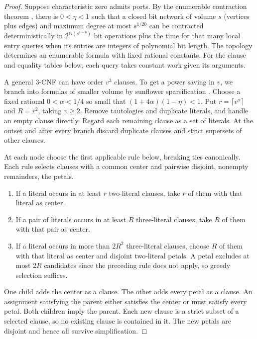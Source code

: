 \begin{proof}
Suppose characteristic zero admits ports. By the enumerable contraction
theorem \cite[Theorem~]{oaP}, there is $0<\eta<1$
such that a closed bit network of volume $s$ (vertices plus edges)
and maximum degree at most $s^{1/20}$ can be contracted
deterministically in $2^{O(s^{1-\eta})}$ bit operations plus the time
for that many local entry queries when its entries are integers of
polynomial bit length. The topology determines an enumerable formula
with fixed rational constants. For the clause and equality tables
below, each query takes constant work given its arguments.

A general 3-CNF can have order $v^3$ clauses. To get a power saving
in $v$, we branch into formulas of smaller volume by sunflower
sparsification \cite{IPZ}. Choose a fixed rational $0<\alpha<1/4$
so small that $(1+4\alpha)(1-\eta)<1$. Put $r=\lceil v^\alpha\rceil$
and $R=r^2$, taking $v\ge2$. Remove tautologies and duplicate literals,
and handle an empty clause directly. Regard each remaining clause as a
set of literals. At the outset and after every branch discard duplicate
clauses and strict supersets of other clauses.

At each node choose the first applicable rule below, breaking ties
canonically. Each rule selects clauses with a common center and
pairwise disjoint, nonempty remainders, the petals.
\begin{enumerate}[leftmargin=*]
\item If a literal occurs in at least $r$ two-literal clauses, take
$r$ of them with that literal as center.
\item If a pair of literals occurs in at least $R$ three-literal
clauses, take $R$ of them with that pair as center.
\item If a literal occurs in more than $2R^2$ three-literal clauses,
choose $R$ of them with that literal as center and disjoint two-literal
petals. A petal excludes at most $2R$ candidates since the preceding
rule does not apply, so greedy selection suffices.
\end{enumerate}
One child adds the center as a clause. The other adds every petal as
a clause. An assignment satisfying the parent either satisfies the
center or must satisfy every petal. Both children imply the parent.
Each new clause is a strict subset of a selected clause, so no
existing clause is contained in it. The new petals are disjoint and
hence all survive simplification.


\end{proof}
